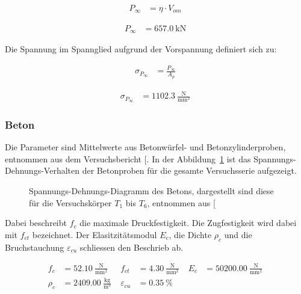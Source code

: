 \documentclass[
  11pt,
  letterpaper,
]{scrreprt}
\begin{document}
$$
\begin{aligned}
P_{\infty} &= \eta \cdot V_{om} \; 
\end{aligned}
$$

$$
\begin{aligned}
P_{\infty} &= 657.0\ \mathrm{kN} \;
\end{aligned}
$$

Die Spannung im Spannglied aufgrund der Vorspannung definiert sich zu:

$$
\begin{aligned}
\sigma_{P_{\infty}} &= \frac{ P_{\infty} }{ A_{p} } \; 
\end{aligned}
$$

$$
\begin{aligned}
\sigma_{P_{\infty}} &= 1102.3\ \frac{\mathrm{N}}{\mathrm{mm}^{2}} \;
\end{aligned}
$$

\subsubsection{Beton}\label{beton}

Die Parameter sind Mittelwerte aus Betonwürfel- und Betonzylinderproben,
entnommen aus dem Versuchsbericht
{[}\citeproc{ref-sigrist_versuche_1993}{5}{]}. In der
Abbildung~\ref{fig-sigma_eps_beton} ist das Spannungs-Dehnungs-Verhalten
der Betonproben für die gesamte Versuchsserie aufgezeigt.

\begin{figure}[H]


\caption{\label{fig-sigma_eps_beton}Spannungs-Dehnungs-Diagramm des
Betons, dargestellt sind diese für die Versuchskörper \(T_1\) bis
\(T_6\), entnommen aus {[}\citeproc{ref-sigrist_versuche_1993}{5}{]}}

\end{figure}%

Dabei beschreibt \(f_c\) die maximale Druckfestigkeit. Die Zugfestigkeit
wird dabei mit \(f_{ct}\) bezeichnet. Der Elasitzitätsmodul \(E_c\), die
Dichte \(\rho_c\) und die Bruchstauchung \(\varepsilon_{cu}\) schliessen
den Beschrieb ab.

$$
\begin{aligned}
f_{c} &= 52.10\ \frac{\mathrm{N}}{\mathrm{mm}^{2}} \; 
 &f_{ct} &= 4.30\ \frac{\mathrm{N}}{\mathrm{mm}^{2}} \; 
 &E_{c} &= 50200.00\ \frac{\mathrm{N}}{\mathrm{mm}^{2}} \; 
\\[11pt]
 \rho_{c} &= 2409.00\ \frac{\mathrm{kg}}{\mathrm{m}^{3}} \; 
 &\varepsilon_{cu} &= 0.35\ \mathrm{\%} \;
\end{aligned}
$$
\end{document}
